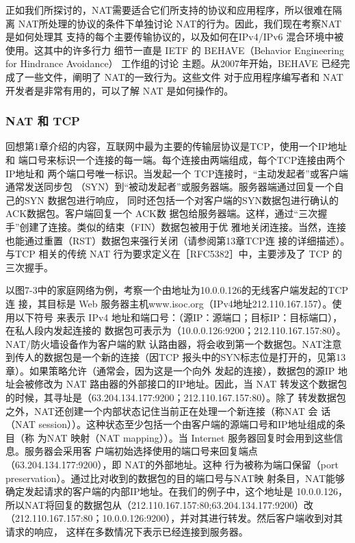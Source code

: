 正如我们所探讨的，NAT需要适合它们所支持的协议和应用程序，所以很难在隔离
NAT所处理的协议的条件下单独讨论 NAT的行为。因此，我们现在考察NAT是如何处理其
支持的每个主要传输协议的，以及如何在IPv4/IPv6 混合环境中被使用。这其中的许多行力
细节一直是 IETF 的 BEHAVE（Behavior Engineering for Hindrance Avoidance） 工作组的讨论
主题。从2007年开始，BEHAVE 已经完成了一些文件，阐明了 NAT的一致行为。这些文件
对于应用程序编写者和 NAT 开发者是非常有用的，可以了解 NAT 是如何操作的。

\subsubsection{NAT 和 TCP}

回想第1章介绍的内容，互联网中最为主要的传输层协议是TCP，使用一个IP地址和
端口号来标识一个连接的每一端。每个连接由两端组成，每个TCP连接由两个IP地址和
两个端口号唯一标识。当发起一个 TCP连接时，“主动发起者”或客户端通常发送同步包
（SYN）到“被动发起者”或服务器端。服务器端通过回复一个自己的SYN 数据包进行响应，
同时还包括一个对客户端的SYN数据包进行确认的ACK数据包。客户端回复一个 ACK数
据包给服务器端。这样，通过“三次握手”创建了连接。类似的结束（FIN）数据包被用于优
雅地关闭连接。当然，连接也能通过重置（RST）数据包来强行关闭（请参阅第13章TCP连
接的详细描述）。与TCP 相关的传统 NAT 行为要求定义在［RFC5382］中，主要涉及了 TCP
的三次握手。

以图7-3中的家庭网络为例，考察一个由地址为10.0.0.126的无线客户端发起的TCP 连
接，其目标是 Web 服务器主机www.isoc.org（IPv4地址212.110.167.157）。使用以下符号
来表示 IPv4 地址和端口号：（源IP：源端口；目标IP：目标端口），在私人段内发起连接的
数据包可表示为（10.0.0.126:9200；212.110.167.157:80）。NAT/防火墙设备作为客户端的默
认路由器，将会收到第一个数据包。NAT注意到传人的数据包是一个新的连接（因TCP
报头中的SYN标志位是打开的，见第13章）。如果策略允许（通常会，因为这是一个向外
发起的连接），数据包的源IP 地址会被修改为 NAT 路由器的外部接口的IP地址。因此，当
NAT 转发这个数据包的时候，其寻址是（63.204.134.177:9200；212.110.167.157:80）。除了
转发数据包之外，NAT还创建一个内部状态记住当前正在处理一个新连接（称NAT 会
话（NAT session））。这种状态至少包括一个由客户端的源端口号和IP地址组成的条目（称
为NAT 映射（NAT mapping））。当 Internet 服务器回复时会用到这些信息。服务器会采用客
户端初始选择使用的端口号来回复端点（63.204.134.177:9200），即 NAT的外部地址。这种
行为被称为端口保留（port preservation）。通过比对收到的数据包的目的端口号与NAT映
射条目，NAT能够确定发起请求的客户端的内部IP地址。在我们的例子中，这个地址是
10.0.0.126，所以NAT将回复的数据包从（212.110.167.157:80;63.204.134.177:9200）改
（212.110.167.157:80；10.0.0.126:9200），并对其进行转发。然后客户端收到对其请求的响应，
这样在多数情况下表示已经连接到服务器。

